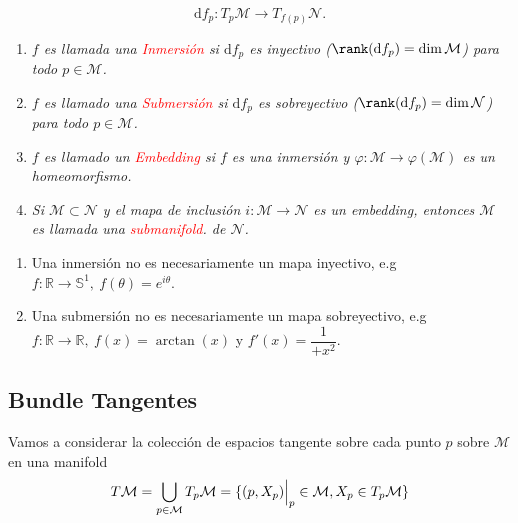 \documentclass[../main]{subfiles}
\begin{document}
\begin{adjustwidth}{0pt}{-100pt}
\begin{equation}
    \mathrm{d}f_p: T_p\mathcal{M}\rightarrow T_{f(p)}\mathcal{N}.
\end{equation}

\begin{enumerate}
    \item \textit{$f$ es llamada una \textcolor{red}{Inmersión} si $\mathrm{d}f_p$ es inyectivo ($\rank(\mathrm{d} f_p)=\dim \mathcal{M}$) para todo $p\in \mathcal{M}$.}
    \item \textit{$f$ es llamado una \textcolor{red}{Submersión} si $\mathrm{d}f_p$ es sobreyectivo ($\rank(\mathrm{d} f_p)=\dim \mathcal{N}$) para todo $p\in \mathcal{M}$.}
    \item \textit{$f$ es llamado un \textcolor{red}{Embedding} si $f$ es una inmersión y $\varphi: \mathcal{M}\rightarrow \varphi(\mathcal{M})$ es un homeomorfismo.}
    \item \textit{Si $\mathcal{M}\subset \mathcal{N}$ y el mapa de inclusión $i: \mathcal{M}\rightarrow \mathcal{N}$ es un embedding, entonces $\mathcal{M}$ es llamada una \textcolor{red}{submanifold}. de $\mathcal{N}$.}
\end{enumerate}

\boxed{\textcolor{red}{Nota}:}
\begin{enumerate}
    \item Una inmersión no es necesariamente un mapa inyectivo, e.g $f:\mathbb{R} \rightarrow \mathbb{S}^1,\ f(\theta)=e^{i\theta}$.
    \item Una submersión no es necesariamente un mapa sobreyectivo, e.g $f: \mathbb{R} \rightarrow \mathbb{R}, \ f(x)=\arctan(x)$ y $f'(x)=\dfrac{1}{+x^2}$.
\end{enumerate}

\subsection{Bundle Tangentes}
Vamos a considerar la colección de espacios tangente sobre cada punto $p$ sobre $\mathcal{M}$ en una manifold 
\begin{equation}
    T \mathcal{M}=\bigcup_{p \in \mathcal{M}} T_p \mathcal{M}=\{(p, X_p)\Big{|}_p \in \mathcal{M}, X_p \in T_p\mathcal{M}\}
\end{equation}


\end{adjustwidth}
\end{document}
